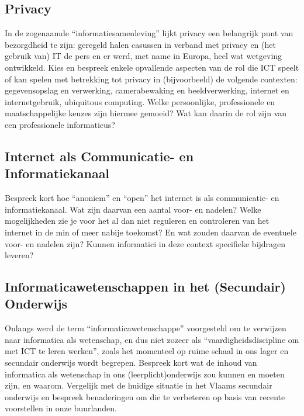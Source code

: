 \documentclass[../main.tex]{subfiles}
\begin{document}
\subsection{Privacy}
\begin{question}
In de zogenaamde ``informatiesamenleving'' lijkt privacy een belangrijk punt van bezorgdheid te zijn: geregeld halen casussen in verband met privacy en (het gebruik van) IT de pers en er werd, met name in Europa, heel wat wetgeving ontwikkeld.
Kies en bespreek enkele opvallende aspecten van de rol die ICT speelt of kan spelen met betrekking tot privacy in (bijvoorbeeld) de volgende contexten: gegevensopslag en verwerking, camerabewaking en beeldverwerking, internet en internetgebruik, ubiquitous computing. Welke persoonlijke, professionele en maatschappelijke keuzes zijn hiermee gemoeid? Wat kan daarin de rol zijn van een professionele informaticus?
\end{question}

\subsection{Internet als Communicatie- en Informatiekanaal}
\begin{question}
Bespreek kort hoe ``anoniem'' en ``open'' het internet is als communicatie- en informatiekanaal. Wat zijn daarvan een aantal voor- en nadelen? Welke mogelijkheden zie je voor het al dan niet reguleren en controleren van het internet in de min of meer nabije toekomst? En wat zouden daarvan de eventuele voor- en nadelen zijn? Kunnen informatici in deze context specifieke bijdragen leveren?
\end{question}

\subsection{Informaticawetenschappen in het (Secundair) Onderwijs}
\begin{question}
Onlangs werd de term ``informaticawetenschappe'' voorgesteld om te verwijzen naar informatica als wetenschap, en dus niet zozeer als “vaardigheidsdiscipline om met ICT te leren werken”, zoals het momenteel op ruime schaal in ons lager en secundair onderwijs wordt begrepen.
Bespreek kort wat de inhoud van informatica als wetenschap in ons (leerplicht)onderwijs zou kunnen en moeten zijn, en waarom. Vergelijk met de huidige situatie in het Vlaams secundair onderwijs en bespreek benaderingen om die te verbeteren op basis van recente voorstellen in onze buurlanden.
\end{question}
\end{document}
